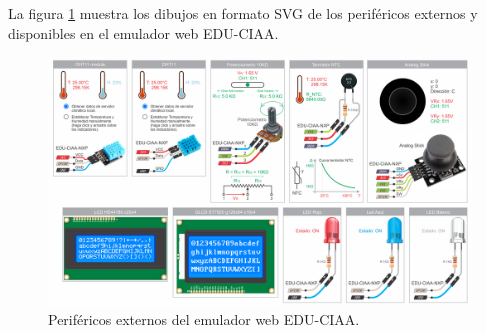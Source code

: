 La figura \ref{fig:perifericosCIAA} muestra los dibujos en formato SVG de los periféricos externos y disponibles en el emulador web EDU-CIAA.

\begin{figure}[ht]
	\centering
	\includegraphics[scale=.34]{./Figures/perifericosCIAA.png}
	\caption{Periféricos externos del emulador web EDU-CIAA.}
	\label{fig:perifericosCIAA}
\end{figure}

